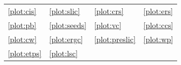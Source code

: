 	{\scriptsize
		\def\arraystretch{0.8}
		\begin{tabularx}{0.475\textwidth}{X X X l}
			\ref{plot:cis} \CIS &
			\ref{plot:slic} \SLIC &
			\ref{plot:crs} \CRS &
			\ref{plot:ers} \ERS \\
			\ref{plot:pb} \PB &
			\ref{plot:seeds} \SEEDS &
			\ref{plot:vc} \VC &
			\ref{plot:ccs} \CCS \\
			\ref{plot:cw} \CW &
			\ref{plot:ergc} \ERGC &
			\ref{plot:preslic} \preSLIC &
			\ref{plot:wp} \WP \\%
			\ref{plot:etps} \ETPS &
			\ref{plot:lsc} \LSC & &
		\end{tabularx}
	}
